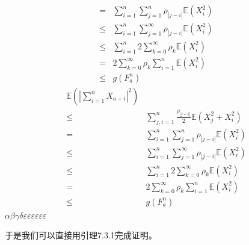\documentclass{ctexart}
\begin{document}
\begin{remark}
\begin{equation}
\begin{aligned}
      =& \sum_{i=1}^{n} \sum_{j=1}^{n}\rho_{|j-i|}\mathbb{E}(X_i^2)\\
      \leq & \sum_{i=1}^{n} \sum_{j=1}^{\infty} \rho_{|j-i|}\mathbb{E}(X_i^2)\\
      \leq & \sum_{i=1}^{n} 2\sum_{k=0}^{\infty} \rho_k \mathbb{E}(X_i^2)\\
      =& 2\sum_{k=0}^{\infty}\rho_k  \sum_{i=1}^{n}\mathbb{E}(X_i^2)\\
      \leq & g(F_a^n)
    \end{aligned}
  \end{equation}
  \begin{equation}
    \begin{aligned}
      \mathbb{E}(|\sum_{i=1}^{n}X_{a+i}|^2) \\
      \leq & \sum_{j,i = 1}^{n} \frac{\rho_{|j-i|}}{2}\mathbb{E}(X_j^2 + X_i^2)\\
      =& \sum_{i=1}^{n} \sum_{j=1}^{n}\rho_{|j-i|}\mathbb{E}(X_i^2)\\
      \leq & \sum_{i=1}^{n} \sum_{j=1}^{\infty} \rho_{|j-i|}\mathbb{E}(X_i^2)\\
      \leq & \sum_{i=1}^{n} 2\sum_{k=0}^{\infty} \rho_k \mathbb{E}(X_i^2)\\
      =& 2\sum_{k=0}^{\infty}\rho_k  \sum_{i=1}^{n}\mathbb{E}(X_i^2)\\
      \leq & g(F_a^n)
    \end{aligned}
  \end{equation}
  \(\alpha \beta \gamma \delta \varepsilon \varepsilon \varepsilon \varepsilon \varepsilon \varepsilon\)

  于是我们可以直接用引理7.3.1完成证明。
\end{remark}
\end{document}
